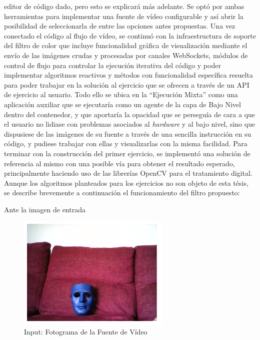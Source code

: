 editor de código dado, pero esto se explicará más adelante. Se optó por ambas herramientas para implementar una fuente de vídeo configurable y así abrir la posibilidad de seleccionarla de entre las opciones antes propuestas. Una vez conectado el código al flujo de vídeo, se continuó con la infraestructura de soporte del filtro de color que incluye funcionalidad gráfica de visualización mediante el envío de las imágenes crudas y procesadas por canales WebSockets, módulos de control de flujo para controlar la ejecución iterativa del código y poder implementar algoritmos reactivos y métodos con funcionalidad específica resuelta para poder trabajar en la solución al ejercicio que se ofrecen a través de un API de ejercicio al usuario. Todo ello se ubica en la ``Ejecución Mixta'' como una aplicación auxiliar que se ejecutaría como un agente de la capa de Bajo Nivel dentro del contenedor, y que aportaría la opacidad que se perseguía de cara a que el usuario no lidiase con problemas asociados al \textit{hardware} y al bajo nivel, sino que dispusiese de las imágenes de su fuente a través de una sencilla instrucción en su código, y pudiese trabajar con ellas y visualizarlas con la misma facilidad. Para terminar con la construcción del primer ejercicio, se implementó una solución de referencia al mismo con una posible vía para obtener el resultado esperado, principalmente haciendo uso de las librerías OpenCV para el tratamiento digital. Aunque los algoritmos planteados para los ejercicios no son objeto de esta tésis, se describe brevemente a continuación el funcionamiento del filtro propuesto:

\begin{center}
Ante la imagen de entrada
\end{center}
\begin{figure}[!hbtp]  \centering\noindent
    \includegraphics[width=0.65\textwidth]{figures/cf_input.png}
    \caption{Input: Fotograma de la Fuente de Vídeo}
    \label{input}
\end{figure}

